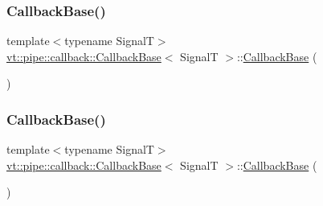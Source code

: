 \mbox{\label{structvt_1_1pipe_1_1callback_1_1_callback_base_aa90843711601bd1174ba64f69f754eb8}} 
\subsubsection{\texorpdfstring{Callback\+Base()}{CallbackBase()}\hspace{0.1cm}{\footnotesize\ttfamily [2/7]}}
{\footnotesize\ttfamily template$<$typename SignalT$>$ \\
\hyperlink{structvt_1_1pipe_1_1callback_1_1_callback_base}{vt\+::pipe\+::callback\+::\+Callback\+Base}$<$ SignalT $>$\+::\hyperlink{structvt_1_1pipe_1_1callback_1_1_callback_base}{Callback\+Base} (\begin{DoxyParamCaption}\item[{\hyperlink{structvt_1_1pipe_1_1callback_1_1_callback_base}{Callback\+Base}$<$ SignalT $>$ \&\&}]{ }\end{DoxyParamCaption})\hspace{0.3cm}{\ttfamily [default]}}

\mbox{\label{structvt_1_1pipe_1_1callback_1_1_callback_base_a683cee48109181768cd44354bc98e3e1}} 
\subsubsection{\texorpdfstring{Callback\+Base()}{CallbackBase()}\hspace{0.1cm}{\footnotesize\ttfamily [3/7]}}
{\footnotesize\ttfamily template$<$typename SignalT$>$ \\
\hyperlink{structvt_1_1pipe_1_1callback_1_1_callback_base}{vt\+::pipe\+::callback\+::\+Callback\+Base}$<$ SignalT $>$\+::\hyperlink{structvt_1_1pipe_1_1callback_1_1_callback_base}{Callback\+Base} (\begin{DoxyParamCaption}{ }\end{DoxyParamCaption})\hspace{0.3cm}{\ttfamily [inline]}}

